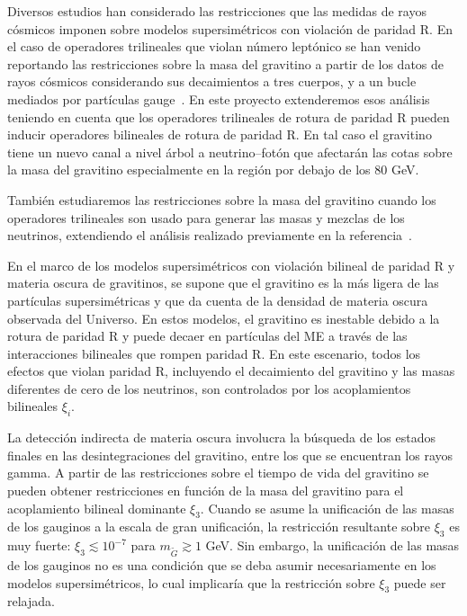 \begin{gravitinodm}

  Diversos estudios han considerado las restricciones que las medidas
  de rayos cósmicos imponen sobre modelos supersimétricos con violación de
  paridad R. En el caso de operadores trilineales que violan número
  leptónico se han venido reportando las restricciones sobre la masa del
  gravitino a partir de los datos de rayos cósmicos considerando sus
  decaimientos a tres cuerpos, y a un bucle mediados por partículas
  gauge~\cite{Lola:2007rw,Lola:2008bk,Bomark:2009zm}. En este proyecto extenderemos esos análisis teniendo en
  cuenta que los operadores trilineales de rotura de paridad R pueden
  inducir operadores bilineales de rotura de paridad R. En tal caso el
  gravitino tiene un nuevo canal a nivel árbol a neutrino--fotón que
  afectarán las cotas sobre la masa del gravitino especialmente en la
  región por debajo de los 80 GeV. 

  También estudiaremos las restricciones sobre la masa del gravitino
  cuando los operadores trilineales son usado para generar las masas y
  mezclas de los neutrinos, extendiendo el análisis realizado
  previamente en la referencia~\cite{Bajc:2010qj}.

En el marco de los modelos supersimétricos con violación bilineal de paridad R y materia oscura de gravitinos, se supone que el gravitino es la más ligera de las partículas supersimétricas y que da cuenta de la densidad de materia oscura observada del Universo. En estos modelos, el gravitino es inestable debido a la rotura de paridad R y puede decaer en partículas del ME a través de las interacciones bilineales que rompen paridad R. En este escenario, todos los efectos que violan paridad R, incluyendo el decaimiento del gravitino y las masas diferentes de cero de los neutrinos, son controlados por los acoplamientos bilineales $\xi_i$. 

La detección indirecta de materia oscura involucra la búsqueda de los estados finales en las desintegraciones del gravitino, entre los que se encuentran los rayos gamma. A partir de las restricciones sobre el tiempo de vida del gravitino se pueden obtener restricciones en función de la masa del gravitino para el acoplamiento bilineal dominante $\xi_3$. Cuando se asume la unificación de las masas de los gauginos a la escala de gran unificación, la restricción resultante sobre $\xi_3$ es muy fuerte: $\xi_3\lesssim 10^{-7}$ para $m_{\tilde G}\gtrsim 1$ GeV.  Sin embargo, la unificación de las masas de los gauginos no es una condición que se deba asumir necesariamente en los modelos supersimétricos, lo cual implicaría que la restricción sobre $\xi_3$ puede ser relajada.


\end{gravitinodm}
